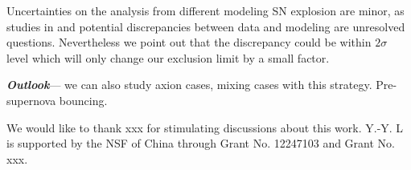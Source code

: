 Uncertainties on the analysis from different modeling SN explosion are minor, as studies in \cite{li2023old} and potential discrepancies between data and modeling are unresolved questions. Nevertheless we point out that the discrepancy could be within $2\sigma$ level which will only change our exclusion limit by a small factor.

\textbf{\textit{Outlook}}---
we can also study axion cases, mixing cases with this strategy. Pre-supernova bouncing.

\begin{acknowledgments}
We would like to thank xxx for stimulating discussions about this work. Y.-Y. L is supported by the NSF of China through Grant
No. 12247103 and Grant No. xxx.
\end{acknowledgments}
